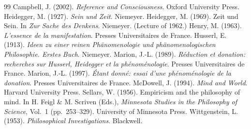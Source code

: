 \documentclass{situationist-preprint}
\begin{document}
\begin{thebibliography}{99}\small
{} Campbell, J. (2002). \emph{Reference and Consciousness}. Oxford University Press.
 Heidegger, M. (1927). \emph{Sein und Zeit}. Niemeyer.
 Heidegger, M. (1969). Zeit und Sein. In \emph{Zur Sache des Denkens}. Niemeyer. (Lecture of 1962.)
 Henry, M. (1963). \emph{L'essence de la manifestation}. Presses Universitaires de France.
 Husserl, E. (1913). \emph{Ideen zu einer reinen Phänomenologie und phänomenologischen Philosophie. Erstes Buch}. Niemeyer.
 Marion, J.-L. (1989). \emph{Réduction et donation: recherches sur Husserl, Heidegger et la phénoménologie}. Presses Universitaires de France.
 Marion, J.-L. (1997). \emph{Étant donné: essai d'une phénoménologie de la donation}. Presses Universitaires de France.
 McDowell, J. (1994). \emph{Mind and World}. Harvard University Press.
 Sellars, W. (1956). Empiricism and the philosophy of mind. In H. Feigl \& M. Scriven (Eds.), \emph{Minnesota Studies in the Philosophy of Science}, Vol.~1 (pp.~253--329). University of Minnesota Press.
 Wittgenstein, L. (1953). \emph{Philosophical Investigations}. Blackwell.
\end{thebibliography}
\end{document}
